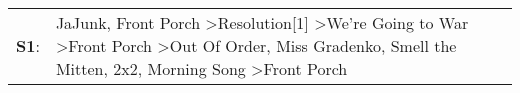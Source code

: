 \begin{supertabular}{p{0.03\textwidth}p{0.92\textwidth}}
 \textbf{S1}:  &  JaJunk\textsuperscript{}, \enspace Front Porch\textsuperscript{} \textgreater \enspace Resolution[1]\textsuperscript{} \textgreater \enspace We're Going to War\textsuperscript{} \textgreater \enspace Front Porch\textsuperscript{} \textgreater \enspace Out Of Order\textsuperscript{}, \enspace Miss Gradenko\textsuperscript{}, \enspace Smell the Mitten\textsuperscript{}, \enspace 2x2\textsuperscript{}, \enspace Morning Song\textsuperscript{} \textgreater \enspace Front Porch\textsuperscript{}  \enspace  \\
\end{supertabular}
